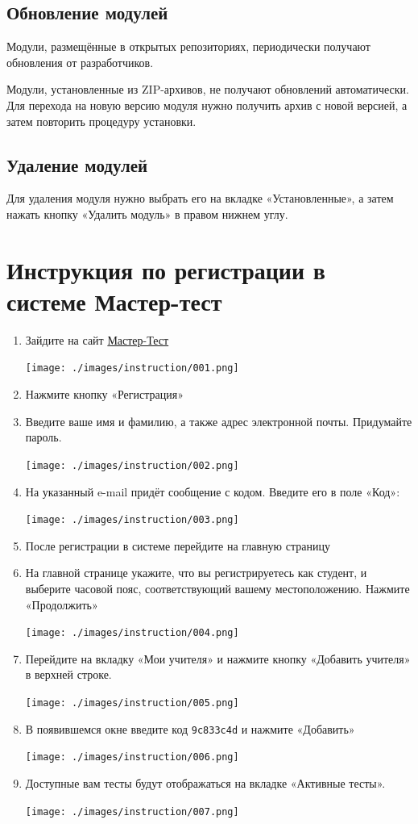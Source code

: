 \documentclass[
  12pt,
]{book}
\begin{document}
\hypertarget{manual-plugins-update}{%
\section{Обновление модулей}\label{manual-plugins-update}}

Модули, размещённые в открытых репозиториях, периодически получают обновления от разработчиков.

Модули, установленные из ZIP-архивов, не получают обновлений автоматически. Для перехода на новую версию модуля нужно получить архив с новой версией, а затем повторить процедуру установки.

\hypertarget{manual-plugins-uninstall}{%
\section{Удаление модулей}\label{manual-plugins-uninstall}}

Для удаления модуля нужно выбрать его на вкладке «Установленные», а затем нажать кнопку «Удалить модуль» в правом нижнем углу.

\hypertarget{mastertest}{%
\chapter{Инструкция по регистрации в системе Мастер-тест}\label{mastertest}}

\begin{enumerate}
\def\labelenumi{\arabic{enumi}.}
\item
  Зайдите на сайт \href{https://master-test.net/ru}{Мастер-Тест}

  \texttt{[image: ./images/instruction/001.png]}
\item
  Нажмите кнопку «Регистрация»
\item
  Введите ваше имя и фамилию, а также адрес электронной почты. Придумайте пароль.

  \texttt{[image: ./images/instruction/002.png]}
\item
  На указанный e-mail придёт сообщение с кодом. Введите его в поле «Код»:

  \texttt{[image: ./images/instruction/003.png]}
\item
  После регистрации в системе перейдите на главную страницу
\item
  На главной странице укажите, что вы регистрируетесь как студент, и выберите часовой пояс, соответствующий вашему местоположению. Нажмите «Продолжить»

  \texttt{[image: ./images/instruction/004.png]}
\item
  Перейдите на вкладку «Мои учителя» и нажмите кнопку «Добавить учителя» в верхней строке.

  \texttt{[image: ./images/instruction/005.png]}
\item
  В появившемся окне введите код \texttt{9c833c4d} и нажмите «Добавить»

  \texttt{[image: ./images/instruction/006.png]}
\item
  Доступные вам тесты будут отображаться на вкладке «Активные тесты».

  \texttt{[image: ./images/instruction/007.png]}
\end{enumerate}

  
\end{document}
